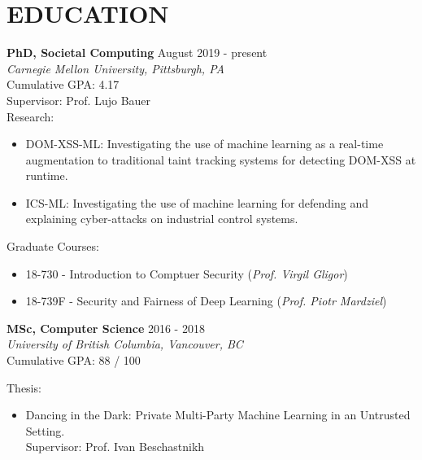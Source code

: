 \documentclass[10pt]{res} %
\begin{document}

\section{EDUCATION} 

\vspace{0.2in} %


\textbf {PhD, Societal Computing} \hfill August 2019 - present \\ 
{\sl Carnegie Mellon University, Pittsburgh, PA} \\
Cumulative GPA: 4.17 \\
Supervisor: Prof. Lujo Bauer \\

Research:
\begin{itemize}   
    \item DOM-XSS-ML: Investigating the use of machine learning as a real-time augmentation to traditional taint tracking systems for detecting DOM-XSS at runtime.
    \item ICS-ML: Investigating the use of machine learning for defending and explaining cyber-attacks on industrial control systems.
\end{itemize}

Graduate Courses:
\begin{itemize} 
    \item 18-730 - Introduction to Comptuer Security (\emph{Prof. Virgil Gligor})
    \item 18-739F - Security and Fairness of Deep Learning (\emph{Prof. Piotr Mardziel})
\end{itemize}


\textbf {MSc, Computer Science} \hfill 2016 - 2018 \\ 
{\sl University of British Columbia, Vancouver, BC} \\
Cumulative GPA: 88 / 100

Thesis:
\begin{itemize} 
    \item Dancing in the Dark: Private Multi-Party Machine Learning in an Untrusted Setting. \\
    Supervisor: Prof. Ivan Beschastnikh
\end{itemize}
\end{document}
